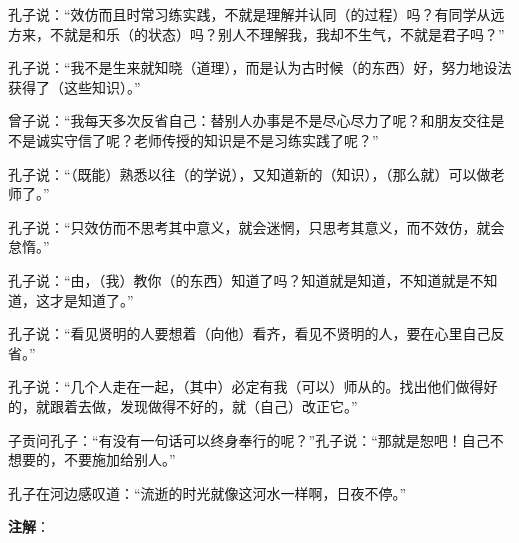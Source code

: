 \documentclass[12pt,UTF-8,openany,a4]{ctexbook}
\begin{document}
\begin{large}\yiwen
    
    孔子说：“效仿而且时常习练实践，不就是理解并认同（的过程）吗？有同学从远方来，不就是和乐（的状态）吗？别人不理解我，我却不生气，不就是君子吗？”
    
    孔子说：“我不是生来就知晓（道理），而是认为古时候（的东西）好，努力地设法获得了（这些知识）。”
    
    曾子说：“我每天多次反省自己：替别人办事是不是尽心尽力了呢？和朋友交往是不是诚实守信了呢？老师传授的知识是不是习练实践了呢？”
    
    孔子说：“（既能）熟悉以往（的学说），又知道新的（知识），（那么就）可以做老师了。”
    
    孔子说：“只效仿而不思考其中意义，就会迷惘，只思考其意义，而不效仿，就会怠惰。”
    
    孔子说：“由，（我）教你（的东西）知道了吗？知道就是知道，不知道就是不知道，这才是知道了。”
    
    孔子说：“看见贤明的人要想着（向他）看齐，看见不贤明的人，要在心里自己反省。”
    
    孔子说：“几个人走在一起，（其中）必定有我（可以）师从的。找出他们做得好的，就跟着去做，发现做得不好的，就（自己）改正它。”
    
    子贡问孔子：“有没有一句话可以终身奉行的呢？”孔子说：“那就是恕吧！自己不想要的，不要施加给别人。”
    
    孔子在河边感叹道：“流逝的时光就像这河水一样啊，日夜不停。”
    

\end{large}


\newpage

\begin{Large}
   \noindent \textbf{注解}：
\end{Large}

\vspace{-1em}
\end{document}
